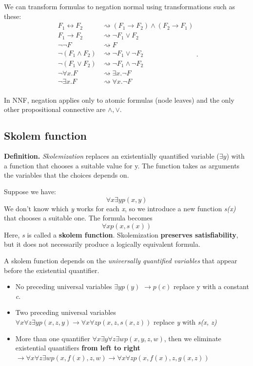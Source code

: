 \documentclass[11pt]{article}
\begin{document}
We can transform formulas to negation normal using transformations such as these: 
\[
\begin{align*}
  F_1 \leftrightarrow F_2 &\mathrel{\rightsquigarrow} (F_1 \to F_2) \land (F_2 \to F_1) \\
  F_1 \to F_2 &\mathrel{\rightsquigarrow} \neg F_1 \lor F_2 \\
  \neg\neg F &\mathrel{\rightsquigarrow} F \\
  \neg(F_1 \land F_2) &\mathrel{\rightsquigarrow} \neg F_1 \lor \neg F_2 \\
  \neg(F_1 \lor F_2) &\mathrel{\rightsquigarrow} \neg F_1 \land \neg F_2 \\
  \neg\forall x.F &\mathrel{\rightsquigarrow} \exists x.\neg F \\
  \neg\exists x.F &\mathrel{\rightsquigarrow} \forall x.\neg F \\
\end{align*}
.\] 

In NNF, negation applies only to atomic formulas (node leaves) and the only other propositional connective are $\land, \lor$. 

\subsection*{Skolem function}

\begin{tcolorbox}[
    enhanced,
    frame hidden,
    borderline west={2pt}{0pt}{black},
    boxsep=5pt,
    left=8pt
]
\textbf{Definition.} \textit{Skolemization} replaces an existentially quantified variable ($\exists y$) with a function that chooses a suitable value for y. The function takes as arguments the variables that the choices depends on. 

Suppose we have: $$\forall x \exists y p(x, y)$$ We don't know which \textit{y} works for each \textit{x}, so we introduce a new function \textit{s(x)} that chooses a suitable one. The formula becomes $$\boxed{\forall x p(x, s(x))}$$ Here, \textit{s} is called a \textbf{skolem function}. Skolemization \textbf{preserves satisfiability}, but it does not necessarily produce a logically equivalent formula. 
\end{tcolorbox}

A skolem function depends on the \textit{universally quantified variables} that appear before the existential quantifier. 
\begin{itemize}
	\item No preceding universal variables $\exists y p(y)$ $\to \boxed{p(c)}$ replace y with a constant \textit{c}.
	\item Two preceding universal variables $\forall x \forall z \exists y p(x, z, y) \to \boxed{\forall x \forall z p(x, z, s(x, z))} $ replace \textit{y} with \textit{s(x, z)}
	\item More than one quantifier $\forall x \exists y \forall z \exists w p(x, y, z, w)$, then we eliminate existential quantifiers \textbf{from left to right} $\to \forall x \forall z \exists w p(x, f(x), z, w) \to \boxed{\forall x \forall z p(x, f(x), z, g(x, z))}$ 
\end{itemize}
\end{document}
